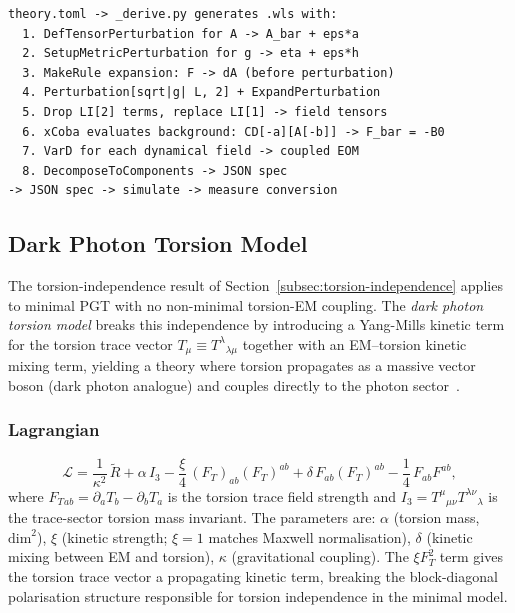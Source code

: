 \begin{lstlisting}[style=bash]
theory.toml -> _derive.py generates .wls with:
  1. DefTensorPerturbation for A -> A_bar + eps*a
  2. SetupMetricPerturbation for g -> eta + eps*h
  3. MakeRule expansion: F -> dA (before perturbation)
  4. Perturbation[sqrt|g| L, 2] + ExpandPerturbation
  5. Drop LI[2] terms, replace LI[1] -> field tensors
  6. xCoba evaluates background: CD[-a][A[-b]] -> F_bar = -B0
  7. VarD for each dynamical field -> coupled EOM
  8. DecomposeToComponents -> JSON spec
-> JSON spec -> simulate -> measure conversion
\end{lstlisting}

\subsection{Dark Photon Torsion Model}
\label{subsec:dark-photon-torsion}

The torsion-independence result of Section~\ref{subsec:torsion-independence} applies
to minimal PGT with no non-minimal torsion-EM coupling.
The \emph{dark photon torsion model} breaks this independence by introducing a
Yang-Mills kinetic term for the torsion trace vector $T_\mu \equiv T^\lambda{}_{\lambda\mu}$
together with an EM--torsion kinetic mixing term, yielding a theory where torsion
propagates as a massive vector boson (dark photon analogue) and couples directly to
the photon sector~\cite{barker2024poincare}.

\subsubsection{Lagrangian}

\begin{equation}
  \mathcal{L}
  = \frac{1}{\kappa^2}\,\widetilde{R}
  + \alpha\, I_3
  - \frac{\xi}{4}\, (F_T)_{ab}(F_T)^{ab}
  + \delta\, F_{ab}(F_T)^{ab}
  - \frac{1}{4}\, F_{ab}F^{ab},
  \label{eq:dark-photon-lagrangian}
\end{equation}
where $F_T{}_{ab} = \partial_a T_b - \partial_b T_a$ is the torsion trace field
strength and $I_3 = T^\mu{}_{\mu\nu} T^{\lambda\nu}{}_\lambda$ is the trace-sector
torsion mass invariant.
The parameters are: $\alpha$ (torsion mass, $\text{dim}^2$), $\xi$ (kinetic strength;
$\xi = 1$ matches Maxwell normalisation), $\delta$ (kinetic mixing between EM and
torsion), $\kappa$ (gravitational coupling).  The $\xi F_T^2$ term gives the torsion
trace vector a propagating kinetic term, breaking the block-diagonal polarisation
structure responsible for torsion independence in the minimal model.

